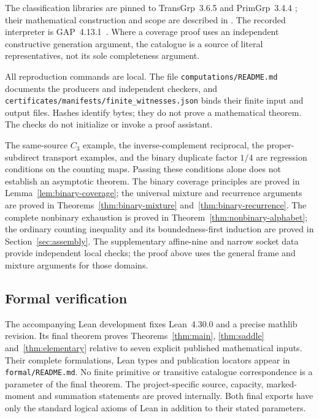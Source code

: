 The classification libraries are pinned to
\textsf{TransGrp}~3.6.5 and \textsf{PrimGrp}~3.4.4
\cite{TransGrp365,PrimGrp344}; their mathematical construction and
scope are described in \cite{Hulpke2005,HoltRoyle2020,RoneyDougal2005Primitive}.
The recorded interpreter is GAP~4.13.1~\cite{GAP4131}.
Where a coverage proof uses an independent constructive generation
argument, the catalogue is a source of literal representatives, not
its sole completeness argument.

All reproduction commands are local. The file
\texttt{computations/README.md} documents the producers and independent
checkers, and \texttt{certificates/manifests/finite\_witnesses.json}
binds their finite input and output files. Hashes identify bytes; they
do not prove a mathematical theorem. The checks do not initialize or
invoke a proof assistant.

The same-source $C_3$ example, the inverse-complement reciprocal, the
proper-subdirect transport examples, and the binary duplicate factor
$1/4$ are regression conditions on the counting maps. Passing these
conditions alone does not establish an asymptotic theorem. The binary
coverage principles are proved in Lemma~\ref{lem:binary-coverage}; the
universal mixture and recurrence arguments are proved in
Theorems~\ref{thm:binary-mixture} and~\ref{thm:binary-recurrence}.
The complete nonbinary exhaustion is proved in
Theorem~\ref{thm:nonbinary-alphabet}; the ordinary counting inequality
and its boundedness-first induction are proved in Section~\ref{sec:assembly}.
The supplementary affine-nine and narrow socket data provide independent
local checks; the proof above uses the general frame and mixture arguments
for those domains.


\subsection{Formal verification}
The accompanying Lean development fixes Lean~4.30.0 and a precise mathlib
revision. Its final theorem proves Theorems~\ref{thm:main},
\ref{thm:saddle} and~\ref{thm:elementary} relative to seven explicit
published mathematical inputs. Their complete formulations, Lean types
and publication locators appear in \texttt{formal/README.md}. No finite
primitive or transitive catalogue correspondence is a parameter of the
final theorem. The project-specific source, capacity, marked-moment and
summation statements are proved internally. Both final exports have only
the standard logical axioms of Lean in addition to their stated parameters.

